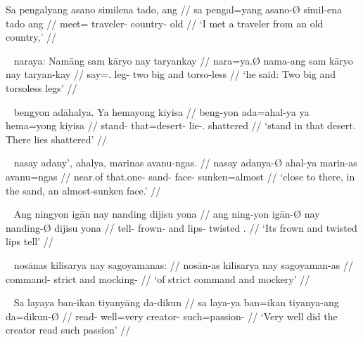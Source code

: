 
\ex\begingl
	\gla Sa pengalyang asano similena tado, ang //
	\glb sa pengal=yang asano-Ø simil-ena tado ang //
	\glc \PatT{} meet=\Fsg{} traveler-\Top{} country-\Gen{} old \AgtT{} //
	\glft `I met a traveler from an old country,' //
\endgl\xe

\ex~\begingl
	\gla naraya: Namāng sam kāryo nay taryankay //
	\glb nara=ya.Ø nama-ang sam kāryo nay taryan-kay //
	\glc say=\TsgM{}.\Top{} leg-\Aarg{} two big and torso-less //
	\glft `he said: Two big and torsoless legs' //
\endgl\xe

\ex~\begingl
	\gla bengyon adāhalya. Ya hemayong kiyisa //
	\glb beng-yon ada=ahal-ya ya hema=yong kiyisa //
	\glc stand-\TplN{} that=desert-\Loc{} \LocT{} lie-\TsgN{}.\Aarg{} 
		shattered //
	\glft `stand in that desert. There lies shattered' //
\endgl\xe

\ex~\begingl
	\gla nasay adany', ahalya, marinas avanu-ngas. //
	\glb nasay adanya-Ø ahal-ya marin-as avanu=ngas //
	\glc near.of that.one-\Top{} sand-\Loc{} face-\Parg{} sunken=almost //
	\glft `close to there, in the sand, an almost-sunken face.' //
\endgl\xe

\ex~\begingl
	\gla Ang ningyon igān nay nanding dijisu yona //
	\glb ang ning-yon igān-Ø nay nanding-Ø dijisu yona //
	\glc \AgtT{} tell-\TplN{} frown-\Top{} and lips-\Top{} twisted 
		\TsgN{}.\Gen{} //
	\glft `Its frown and twisted lips tell' //
\endgl\xe

\ex~\begingl
	\gla nosānas kilisarya nay sagoyamanas: //
	\glb nosān-as kilisarya nay sagoyaman-as //
	\glc command-\Parg{} strict and mocking-\Parg{} //
	\glft `of strict command and mockery' //
\endgl\xe

\ex~\begingl
	\gla Sa layaya ban-ikan tiyanyāng da-dikun //
	\glb sa laya-ya ban=ikan tiyanya-ang da=dikun-Ø //
	\glc \PatT{} read-\TsgM{} well=very creator-\Aarg{} such=passion-\Top{} //
	\glft `Very well did the creator read such passion' //
\endgl\xe

